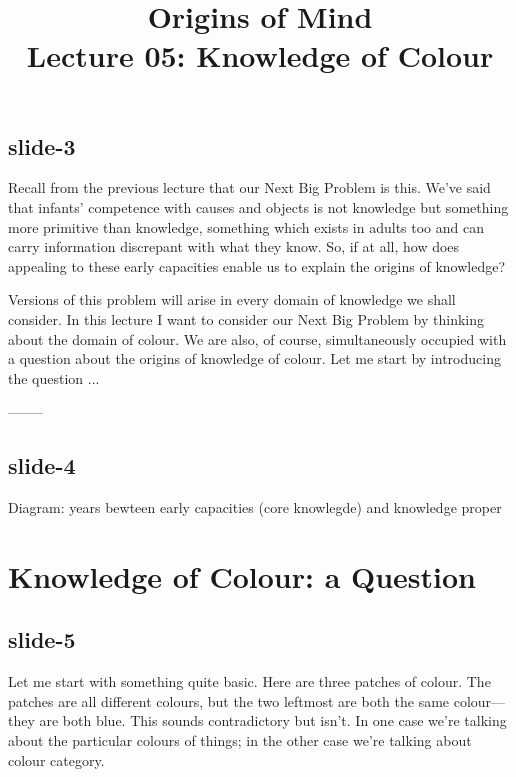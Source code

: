 \documentclass[12pt,\papersize]{extarticle}
\begin{document}
\setlength\footnotesep{1em}







\title {Origins of Mind \\ Lecture 05: Knowledge of Colour}



\maketitle

\subsection{slide-3}
Recall from the previous lecture that our Next Big Problem is this.
We've said that infants' competence with causes and objects is not knowledge but something
more primitive than knowledge, something which exists in adults too and can carry information
discrepant with what they know. So, if at all, how does appealing to these early capacities
enable us to explain the origins of knowledge?

Versions of this problem will arise in every domain of knowledge we shall consider.
In this lecture I want to consider our Next Big Problem by thinking about the domain of colour.
We are also, of course, simultaneously occupied with a question about the origins of knowledge
of colour.
Let me start by introducing the question ...

--------
\subsection{slide-4}
Diagram: years bewteen early capacities (core knowlegde) and knowledge proper



\section{Knowledge of Colour: a Question}

\subsection{slide-5}
Let me start with something quite basic.
Here are three patches of colour.
The patches are all different colours, but the two leftmost are both the same colour---they are both blue.
This sounds contradictory but isn't.
In one case we're talking about the particular colours of things; in the other case we're talking about colour category.
\end{document}
